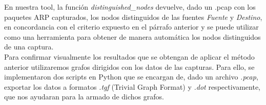 \indent En nuestra tool, la función \textit{distinguished\_nodes} devuelve, dado un .pcap con los paquetes ARP capturados, los nodos distinguidos de las fuentes \textit{Fuente} y \textit{Destino}, en concordancia con el criterio expuesto en el párrafo anterior y se puede utilizar como una herramienta para obtener de manera automática los nodos distinguidos de una captura.\\
\indent Para confirmar visualmente los resultados que se obtengan de aplicar el método anterior utilizaremos grafos dirigidos con los datos de las capturas. Para ello, se implementaron dos scripts en Python que se encargan de, dado un archivo \textit{.pcap}, exportar los datos a formatos \textit{.tgf} (Trivial Graph Format) y \textit{.dot} respectivamente, que nos ayudaran para la armado de dichos grafos.\\
